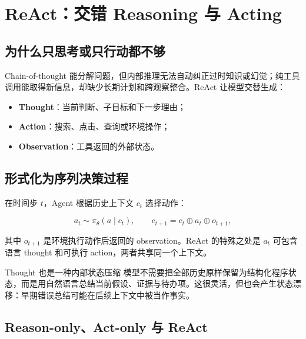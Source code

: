 \section{ReAct：交错 Reasoning 与 Acting}

\subsection{为什么只思考或只行动都不够}

Chain-of-thought 能分解问题，但内部推理无法自动纠正过时知识或幻觉；纯工具调用能取得新信息，却缺少长期计划和跨观察整合。ReAct 让模型交替生成：

\begin{itemize}
    \item \textbf{Thought}：当前判断、子目标和下一步理由；
    \item \textbf{Action}：搜索、点击、查询或环境操作；
    \item \textbf{Observation}：工具返回的外部状态。
\end{itemize}



\subsection{形式化为序列决策过程}

在时间步 $t$，Agent 根据历史上下文 $c_t$ 选择动作：

$$
a_t\sim\pi_\theta(a\mid c_t),\qquad
c_{t+1}=c_t\oplus a_t\oplus o_{t+1},
$$

其中 $o_{t+1}$ 是环境执行动作后返回的 observation。ReAct 的特殊之处是 $a_t$ 可包含语言 thought 和可执行 action，两者共享同一个上下文。


\begin{knowledgebox}{Thought 也是一种内部状态压缩}
模型不需要把全部历史原样保留为结构化程序状态，而是用自然语言总结当前假设、证据与待办项。这很灵活，但也会产生状态漂移：早期错误总结可能在后续上下文中被当作事实。
\end{knowledgebox}

\subsection{Reason-only、Act-only 与 ReAct}

